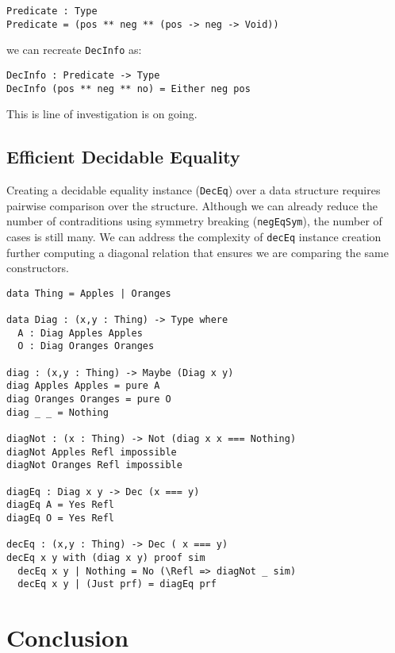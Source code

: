 \documentclass[%
draft,
a4paper,
UKenglish,
cleveref,
autoref,
thm-restate,
pdfa
]{oasics-v2021}
\begin{document}
\begin{verbatim}
Predicate : Type
Predicate = (pos ** neg ** (pos -> neg -> Void))
\end{verbatim}

we can recreate \texttt{DecInfo} as:

\begin{verbatim}
DecInfo : Predicate -> Type
DecInfo (pos ** neg ** no) = Either neg pos
\end{verbatim}

This is line of investigation is on going.

\subsection{Efficient Decidable Equality}
\label{sec:idioms:decEq}



Creating a decidable equality instance (\texttt{DecEq}) over a data structure requires pairwise comparison over the structure.
Although we can already reduce the number of contraditions using symmetry breaking (\texttt{negEqSym}), the number of cases is still many.
We can address the complexity of \texttt{decEq} instance creation further computing a diagonal relation that ensures we are comparing the same constructors.


\begin{verbatim}
data Thing = Apples | Oranges

data Diag : (x,y : Thing) -> Type where
  A : Diag Apples Apples
  O : Diag Oranges Oranges

diag : (x,y : Thing) -> Maybe (Diag x y)
diag Apples Apples = pure A
diag Oranges Oranges = pure O
diag _ _ = Nothing

diagNot : (x : Thing) -> Not (diag x x === Nothing)
diagNot Apples Refl impossible
diagNot Oranges Refl impossible

diagEq : Diag x y -> Dec (x === y)
diagEq A = Yes Refl
diagEq O = Yes Refl

decEq : (x,y : Thing) -> Dec ( x === y)
decEq x y with (diag x y) proof sim
  decEq x y | Nothing = No (\Refl => diagNot _ sim)
  decEq x y | (Just prf) = diagEq prf
\end{verbatim}

\section{Conclusion}
\label{sec:conclusion}



\end{document}
